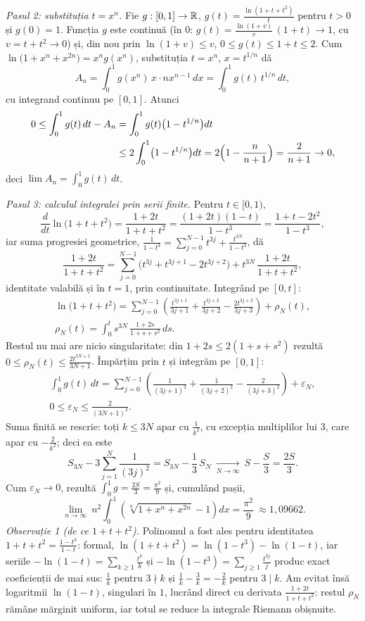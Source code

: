 \emph{Pasul 2: substituția $t=x^{n}$.} Fie $g:[0,1]\to\mathbb{R}$, $g(t)=\frac{\ln(1+t+t^{2})}{t}$ pentru $t>0$ și $g(0)=1$. Funcția $g$ este continuă (în $0$: $g(t)=\frac{\ln(1+v)}{v}\,(1+t)\to1$, cu $v=t+t^{2}\to0$) și, din nou prin $\ln(1+v)\le v$, $0\le g(t)\le1+t\le2$. Cum $\ln\bigl(1+x^{n}+x^{2n}\bigr)=x^{n}g(x^{n})$, substituția $t=x^{n}$, $x=t^{1/n}$ dă
\[ A_{n}=\int_{0}^{1}g(x^{n})\,x\cdot nx^{n-1}\,dx=\int_{0}^{1}g(t)\,t^{1/n}\,dt , \]
cu integrand continuu pe $[0,1]$. Atunci
\[ \begin{aligned} 0\le\int_{0}^{1}g(t)\,dt-A_{n}&=\int_{0}^{1}g(t)\bigl(1-t^{1/n}\bigr)dt\\ &\le2\int_{0}^{1}\bigl(1-t^{1/n}\bigr)dt=2\Bigl(1-\frac{n}{n+1}\Bigr)=\frac{2}{n+1}\to0 , \end{aligned} \]
deci $\lim A_{n}=\int_{0}^{1}g(t)\,dt$.

\emph{Pasul 3: calculul integralei prin serii finite.} Pentru $t\in[0,1)$,
\[ \frac{d}{dt}\ln\bigl(1+t+t^{2}\bigr)=\frac{1+2t}{1+t+t^{2}}=\frac{(1+2t)(1-t)}{1-t^{3}}=\frac{1+t-2t^{2}}{1-t^{3}} , \]
iar suma progresiei geometrice, $\frac{1}{1-t^{3}}=\sum_{j=0}^{N-1}t^{3j}+\frac{t^{3N}}{1-t^{3}}$, dă
\[ \frac{1+2t}{1+t+t^{2}}=\sum_{j=0}^{N-1}\bigl(t^{3j}+t^{3j+1}-2t^{3j+2}\bigr)+t^{3N}\,\frac{1+2t}{1+t+t^{2}} , \]
identitate valabilă și în $t=1$, prin continuitate. Integrând pe $[0,t]$:
\[ \begin{gathered} \ln\bigl(1+t+t^{2}\bigr)=\sum_{j=0}^{N-1}\left(\frac{t^{3j+1}}{3j+1}+\frac{t^{3j+2}}{3j+2}-\frac{2t^{3j+3}}{3j+3}\right)+\rho_{N}(t),\\ \rho_{N}(t)=\int_{0}^{t}s^{3N}\,\frac{1+2s}{1+s+s^{2}}\,ds . \end{gathered} \]
Restul nu mai are nicio singularitate: din $1+2s\le2(1+s+s^{2})$ rezultă $0\le\rho_{N}(t)\le\frac{2t^{3N+1}}{3N+1}$. Împărțim prin $t$ și integrăm pe $[0,1]$:
\[ \begin{gathered} \int_{0}^{1}g(t)\,dt=\sum_{j=0}^{N-1}\left(\frac{1}{(3j+1)^{2}}+\frac{1}{(3j+2)^{2}}-\frac{2}{(3j+3)^{2}}\right)+\varepsilon_{N},\\ 0\le\varepsilon_{N}\le\frac{2}{(3N+1)^{2}} . \end{gathered} \]
Suma finită se rescrie: toți $k\le3N$ apar cu $\frac1{k^{2}}$, cu excepția multiplilor lui $3$, care apar cu $-\frac{2}{k^{2}}$; deci ea este
\[ S_{3N}-3\sum_{j=1}^{N}\frac{1}{(3j)^{2}}=S_{3N}-\frac13\,S_{N}\ \xrightarrow[N\to\infty]{}\ S-\frac S3=\frac{2S}{3} . \]
Cum $\varepsilon_{N}\to0$, rezultă $\int_{0}^{1}g=\frac{2S}{3}=\frac{\pi^{2}}{9}$ și, cumulând pașii,
\[ \boxed{\ \lim_{n\to\infty}\ n^{2}\int_{0}^{1}\left(\sqrt[n]{1+x^{n}+x^{2n}}-1\right)dx=\frac{\pi^{2}}{9}\ }\approx1{,}09662 . \]
\emph{Observație 1 (de ce $1+t+t^{2}$).} Polinomul a fost ales pentru identitatea $1+t+t^{2}=\frac{1-t^{3}}{1-t}$: formal, $\ln(1+t+t^{2})=\ln(1-t^{3})-\ln(1-t)$, iar seriile $-\ln(1-t)=\sum_{k\ge1}\frac{t^{k}}{k}$ și $-\ln(1-t^{3})=\sum_{j\ge1}\frac{t^{3j}}{j}$ produc exact coeficienții de mai sus: $\frac1k$ pentru $3\nmid k$ și $\frac1k-\frac3k=-\frac2k$ pentru $3\mid k$. Am evitat însă logaritmii $\ln(1-t)$, singulari în $1$, lucrând direct cu derivata $\frac{1+2t}{1+t+t^{2}}$: restul $\rho_{N}$ rămâne mărginit uniform, iar totul se reduce la integrale Riemann obișnuite.

